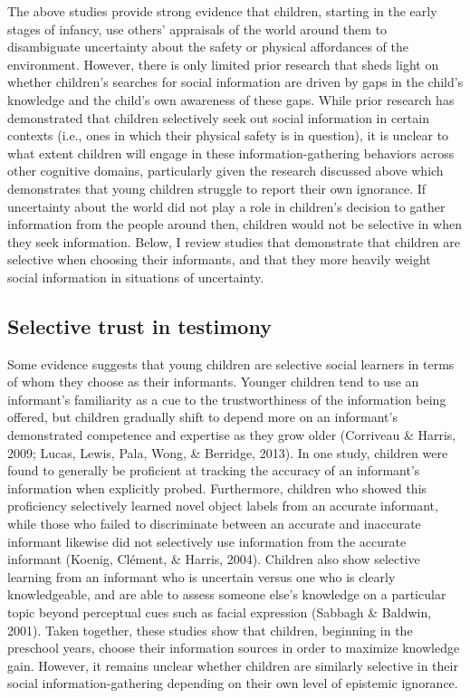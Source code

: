 \documentclass[floatsintext,man]{apa6}
\theoremstyle{definition}
\theoremstyle{definition}
\theoremstyle{definition}
\theoremstyle{remark}
\begin{document}
The above studies provide strong evidence that children, starting in the
early stages of infancy, use others' appraisals of the world around them
to disambiguate uncertainty about the safety or physical affordances of
the environment. However, there is only limited prior research that
sheds light on whether children's searches for social information are
driven by gaps in the child's knowledge and the child's own awareness of
these gaps. While prior research has demonstrated that children
selectively seek out social information in certain contexts (i.e., ones
in which their physical safety is in question), it is unclear to what
extent children will engage in these information-gathering behaviors
across other cognitive domains, particularly given the research
discussed above which demonstrates that young children struggle to
report their own ignorance. If uncertainty about the world did not play
a role in children's decision to gather information from the people
around then, children would not be selective in when they seek
information. Below, I review studies that demonstrate that children are
selective when choosing their informants, and that they more heavily
weight social information in situations of uncertainty.

\subsection{Selective trust in
testimony}\label{selective-trust-in-testimony}

Some evidence suggests that young children are selective social learners
in terms of whom they choose as their informants. Younger children tend
to use an informant's familiarity as a cue to the trustworthiness of the
information being offered, but children gradually shift to depend more
on an informant's demonstrated competence and expertise as they grow
older (Corriveau \& Harris, 2009; Lucas, Lewis, Pala, Wong, \& Berridge,
2013). In one study, children were found to generally be proficient at
tracking the accuracy of an informant's information when explicitly
probed. Furthermore, children who showed this proficiency selectively
learned novel object labels from an accurate informant, while those who
failed to discriminate between an accurate and inaccurate informant
likewise did not selectively use information from the accurate informant
(Koenig, Clément, \& Harris, 2004). Children also show selective
learning from an informant who is uncertain versus one who is clearly
knowledgeable, and are able to assess someone else's knowledge on a
particular topic beyond perceptual cues such as facial expression
(Sabbagh \& Baldwin, 2001). Taken together, these studies show that
children, beginning in the preschool years, choose their information
sources in order to maximize knowledge gain. However, it remains unclear
whether children are similarly selective in their social
information-gathering depending on their own level of epistemic
ignorance.
\end{document}

